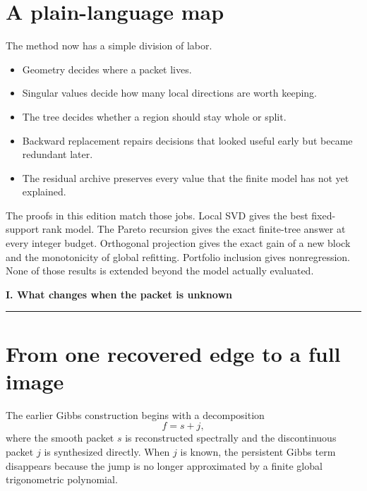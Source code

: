 \documentclass[11pt]{article}
\theoremstyle{definition}
\theoremstyle{remark}
\newcommand{\InlinePart}[1]{%
  \Needspace{15\baselineskip}%
  \vspace{1.5em}%
  {\color{Blue}\LARGE\bfseries #1\par}%
  \vspace{0.55em}%
  {\color{Blue}\rule{\linewidth}{1.1pt}}\par%
  \vspace{0.75em}%
}
\begin{document}
\begin{abstract}
The proof-oriented verification suite checks $12{,}154$ deterministic and randomized scenarios in eleven groups. It includes $9{,}960$ exact comparisons between dynamic programming and exhaustive tree enumeration, together with local SVD identities, block-gain calculations, projection monotonicity, singular-gap stability, region partitions, archive identities, and portfolio nonregression.

The reconstruction contract remains exact at every finite stage:
\[
\boxed{F=\widehat F+R_{\mathrm{archive}}.}
\]
The packet model may be compressed. The full image is still accounted for.
\end{abstract}

\begingroup
\small
\setlength{\parskip}{0pt}
\tableofcontents
\endgroup

\section*{A plain-language map}
The method now has a simple division of labor.

\begin{itemize}
\item Geometry decides where a packet lives.
\item Singular values decide how many local directions are worth keeping.
\item The tree decides whether a region should stay whole or split.
\item Backward replacement repairs decisions that looked useful early but became redundant later.
\item The residual archive preserves every value that the finite model has not yet explained.
\end{itemize}

The proofs in this edition match those jobs. Local SVD gives the best fixed-support rank model. The Pareto recursion gives the exact finite-tree answer at every integer budget. Orthogonal projection gives the exact gain of a new block and the monotonicity of global refitting. Portfolio inclusion gives nonregression. None of those results is extended beyond the model actually evaluated.

\InlinePart{I. What changes when the packet is unknown}

\section{From one recovered edge to a full image}
The earlier Gibbs construction begins with a decomposition
\[
f=s+j,
\]
where the smooth packet $s$ is reconstructed spectrally and the discontinuous packet $j$ is synthesized directly. When $j$ is known, the persistent Gibbs term disappears because the jump is no longer approximated by a finite global trigonometric polynomial.
\end{document}
